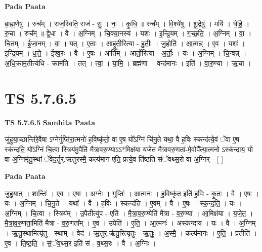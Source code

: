\documentclass[17pt]{extarticle}
\begin{document}
\textbf{Pada Paata} \newline

ब्रा॒ह्म॒णेषु॑ । रुच᳚म् । राज॒स्विति॒ राज॑ - सु॒ । नः॒ । कृ॒धि॒ ॥ रुच᳚म् । वि॒श्ये॑षु । शू॒द्रेषु॑ । मयि॑ । धे॒हि॒ । रु॒चा । रुच᳚म् ॥ द्वे॒धा । वै । अ॒ग्निम् । चि॒क्या॒नस्य॑ । यशः॑ । इ॒न्द्रि॒यम् । ग॒च्छ॒ति॒ । अ॒ग्निम् । वा॒ । चि॒तम् । ई॒जा॒नम् । वा॒ । यत् । ए॒ताः । आहु॑ती॒रित्या - हु॒तीः॒ । जु॒होति॑ । आ॒त्मन्न् । ए॒व । यशः॑ । इ॒न्द्रि॒यम् । ध॒त्ते॒ । ई॒श्व॒रः । वै । ए॒षः । आर्ति᳚म् । आर्तो॒रित्या - अ॒र्तोः॒ । यः । अ॒ग्निम् । चि॒न्वन्न् । अ॒धि॒क्राम॒तीत्य॑धि - क्राम॑ति । तत् । त्वा॒ । या॒मि॒ । ब्रह्म॑णा । वन्द॑मानः । इति॑ । वा॒रु॒ण्या । ऋ॒चा ।  \newline





\section{ TS 5.7.6.5 }

\textbf{TS 5.7.6.5 } \newline
\textbf{Samhita Paata} \newline

जु॑हुया॒च्छान्ति॑रे॒वैषा ऽग्नेर्गुप्ति॑रा॒त्मनो॑ ह॒विष्कृ॑तो॒ वा ए॒ष यो᳚ऽग्निं चि॑नु॒ते यथा॒ वै ह॒विः स्कन्द॑त्ये॒वं ॅवा ए॒ष स्क॑न्दति॒ यो᳚ऽग्निं चि॒त्वा स्त्रिय॑मु॒पैति॑ मैत्रावरु॒ण्याऽऽ*मिक्ष॑या यजेत मैत्रावरु॒णता॑-मे॒वोपै᳚त्या॒त्मनो ऽस्क॑न्दाय॒ यो वा अ॒ग्निमृ॑तु॒स्थां ॅवेद॒र्तुर्.ऋ॑तुरस्मै॒ कल्प॑मान एति॒ प्रत्ये॒व ति॑ष्ठति संॅवथ्स॒रो वा अ॒ग्निर् - [  ] \newline

\textbf{Pada Paata} \newline

जु॒हु॒या॒त् । शान्तिः॑ । ए॒व । ए॒षा । अ॒ग्नेः । गुप्तिः॑ । आ॒त्मनः॑ । ह॒विष्कृ॑त॒ इति॑ ह॒विः - कृ॒तः॒ । वै । ए॒षः । यः । अ॒ग्निम् । चि॒नु॒ते । यथा᳚ । वै । ह॒विः । स्कन्द॑ति । ए॒वम् । वै । ए॒षः । स्क॒न्द॒ति॒ । यः । अ॒ग्निम् । चि॒त्वा । स्त्रिय᳚म् । उ॒पैतीत्यु॑प - एति॑ । मै॒त्रा॒व॒रु॒ण्येति॑ मैत्रा - व॒रु॒ण्या । आ॒मिक्ष॑या । य॒जे॒त॒ । मै॒त्रा॒व॒रु॒णता॒मिति॑ मैत्रा - व॒रु॒णता᳚म् । ए॒व । उपेति॑ । ए॒ति॒ । आ॒त्मनः॑ । अस्क॑न्दाय । यः । वै । अ॒ग्निम् । ऋ॒तु॒स्थामित्यृ॑तु - स्थाम् । वेद॑ । ऋ॒तुर्.ऋ॑तु॒रित्यृ॒तुः - ऋ॒तुः॒ । अ॒स्मै॒ । कल्प॑मानः । ए॒ति॒ । प्रतीति॑ । ए॒व । ति॒ष्ठ॒ति॒ । सं॒ॅव॒थ्स॒र इति॑ सं - व॒थ्स॒रः । वै । अ॒ग्निः ।  \newline
\end{document}

